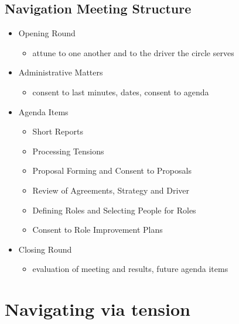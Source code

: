 \subsection{Navigation Meeting Structure}
\label{navigationmeetingstructure}

\begin{itemize}
\item Opening Round

\begin{itemize}
\item attune to one another and to the driver the circle serves

\end{itemize}

\item Administrative Matters

\begin{itemize}
\item consent to last minutes, dates, consent to agenda

\end{itemize}

\item Agenda Items

\begin{itemize}
\item Short Reports

\item Processing Tensions

\item Proposal Forming and Consent to Proposals

\item Review of Agreements, Strategy and Driver

\item Defining Roles and Selecting People for Roles

\item Consent to Role Improvement Plans

\end{itemize}

\item Closing Round

\begin{itemize}
\item evaluation of meeting and results, future agenda items

\end{itemize}

\end{itemize}

\section{Navigating via tension}
\label{navigatingviatension}

